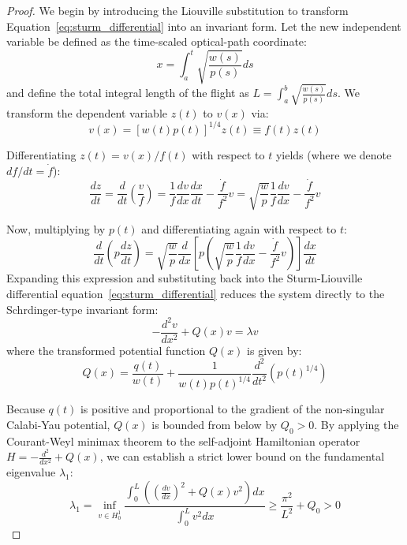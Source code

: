 \documentclass[11pt,a4paper]{book}
\begin{document}
\begin{proof}
We begin by introducing the Liouville substitution to transform Equation~\eqref{eq:sturm_differential} into an invariant form. Let the new independent variable be defined as the time-scaled optical-path coordinate:
\begin{equation}
\label{eq:liouville_variable}
x = \int_a^t \sqrt{\frac{w(s)}{p(s)}} ds
\end{equation}
and define the total integral length of the flight as $L = \int_a^b \sqrt{\frac{w(s)}{p(s)}} ds$. We transform the dependent variable $z(t)$ to $v(x)$ via:
\begin{equation}
\label{eq:liouville_sub}
v(x) = \left[ w(t) p(t) \right]^{1/4} z(t) \equiv f(t) z(t)
\end{equation}

Differentiating $z(t) = v(x) / f(t)$ with respect to $t$ yields (where we denote $df/dt = \dot{f}$):
\begin{equation}
\label{eq:first_deriv_sub}
\frac{dz}{dt} = \frac{d}{dt}\left( \frac{v}{f} \right) = \frac{1}{f} \frac{dv}{dx} \frac{dx}{dt} - \frac{\dot{f}}{f^2} v = \sqrt{\frac{w}{p}} \frac{1}{f} \frac{dv}{dx} - \frac{\dot{f}}{f^2} v
\end{equation}

Now, multiplying by $p(t)$ and differentiating again with respect to $t$:
\begin{equation}
\label{eq:second_deriv_sub}
\frac{d}{dt}\left( p \frac{dz}{dt} \right) = \sqrt{\frac{w}{p}} \frac{d}{dx}\left[ p \left( \sqrt{\frac{w}{p}} \frac{1}{f} \frac{dv}{dx} - \frac{\dot{f}}{f^2} v \right) \right] \frac{dx}{dt}
\end{equation}
Expanding this expression and substituting back into the Sturm-Liouville differential equation~\eqref{eq:sturm_differential} reduces the system directly to the Schrdinger-type invariant form:
\begin{equation}
\label{eq:invariant_schrodinger}
-\frac{d^2 v}{dx^2} + Q(x) v = \lambda v
\end{equation}
where the transformed potential function $Q(x)$ is given by:
\begin{equation}
\label{eq:transformed_potential}
Q(x) = \frac{q(t)}{w(t)} + \frac{1}{w(t) p(t)^{1/4}} \frac{d^2}{dt^2}\left( p(t)^{1/4} \right)
\end{equation}

Because $q(t)$ is positive and proportional to the gradient of the non-singular Calabi-Yau potential, $Q(x)$ is bounded from below by $Q_0 > 0$. By applying the Courant-Weyl minimax theorem to the self-adjoint Hamiltonian operator $H = -\frac{d^2}{dx^2} + Q(x)$, we can establish a strict lower bound on the fundamental eigenvalue $\lambda_1$:
\begin{equation}
\label{eq:eigenvalue_lower_bound}
\lambda_1 = \inf_{v \in H^1_0} \frac{\int_0^L \left( \left(\frac{dv}{dx}\right)^2 + Q(x) v^2 \right) dx}{\int_0^L v^2 dx} \ge \frac{\pi^2}{L^2} + Q_0 > 0
\end{equation}


\end{proof}
\end{document}
